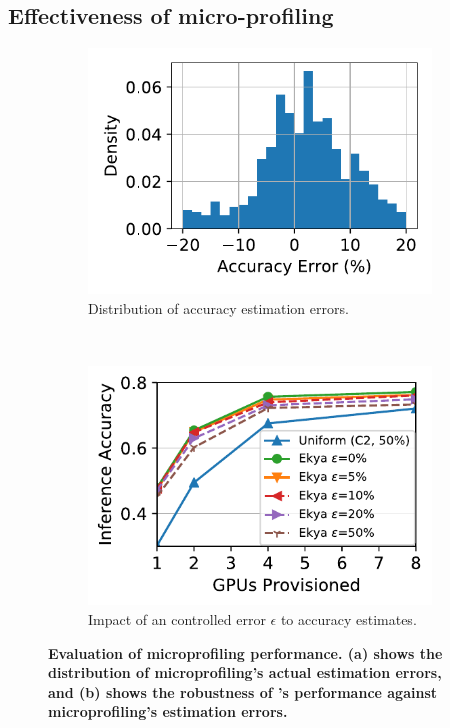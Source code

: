 \subsection{Effectiveness of micro-profiling}
\label{subsec:eval-profiling}


\begin{figure}[t]
\captionsetup[subfigure]{justification=centering}
  \centering
  \begin{subfigure}[t]{0.48\linewidth}
    \centering
    \includegraphics[width=\linewidth]{ekya/results/microprofiling/microprofiling_accerror.pdf}
    \caption{\small Distribution of accuracy estimation errors.}
    \label{fig:microprofiling-benchmark}
  \end{subfigure}
  ~
  \begin{subfigure}[t]{0.48\linewidth}
    \centering
    \includegraphics[width=\linewidth]{ekya/results/sensitivity/sensitivity_profileerrors_cityscapes.pdf} 
    \caption{\small Impact of an controlled error $\epsilon$ to accuracy estimates.}
    \label{fig:sensitivity-accuracy-error}
  \end{subfigure}
  \caption{
      \small \bf Evaluation of microprofiling performance. (a) shows the distribution of microprofiling's actual estimation errors, and (b) shows the robustness of \name's performance against microprofiling's estimation errors.
  }
\end{figure}


